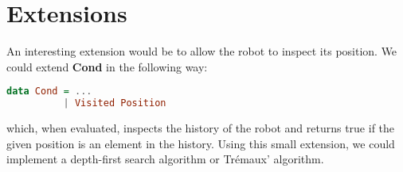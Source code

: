 \documentclass[a4paper]{article}
\newcommand{\func}[1]{\textbf{\ttfamily #1}\xspace}
\begin{document}
\section{Extensions}
An interesting extension would be to allow the robot to inspect its
position. We could extend \func{Cond} in the following way:
\begin{lstlisting}[language=haskell]
data Cond = ...
          | Visited Position
\end{lstlisting}
which, when evaluated, inspects the history of the robot and returns
true if the given position is an element in the history. Using this
small extension, we could implement a depth-first search algorithm or
Trémaux' algorithm.
\end{document}
